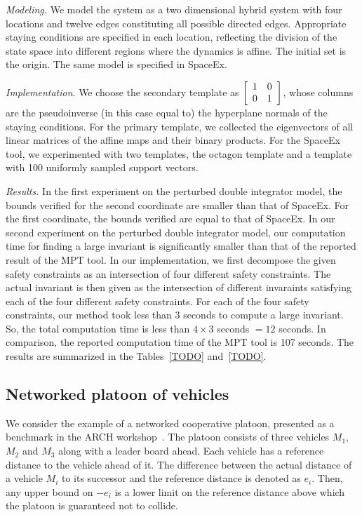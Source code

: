 \emph{Modeling.}  We model the system as a two dimensional hybrid
system with four locations and twelve edges constituting all possible
directed edges.  Appropriate staying conditions are specified in each
location, reflecting the division of the state space into different
regions where the dynamics is affine.  The initial set is the origin.
The same model is specified in SpaceEx.

\emph{Implementation}.  We choose the secondary template as
$\left[\begin{array}{ll}1 & 0\\0 & 1\end{array}\right]$, whose columns are
the pseudoinverse (in this case equal to) the hyperplane normals of
the staying conditions.  For the primary template, we collected the
eigenvectors of all linear matrices of the affine maps and their
binary products. For the SpaceEx tool, we experimented with two
templates, the octagon template and a template with 100 uniformly
sampled support vectors.

\emph{Results.}  In the first experiment on the perturbed double
integrator model, the bounds verified for the second coordinate are
smaller than that of SpaceEx.  For the first coordinate, the bounds
verified are equal to that of SpaceEx.  In our second experiment on
the perturbed double integrator model, our computation time for
finding a large invariant is significantly smaller than that of the
reported result of the MPT tool.  In our implementation, we first
decompose the given safety constraints as an intersection of four
different safety constraints.  The actual invariant is then given as
the intersection of different invaraints satisfying each of the four
different safety constraints.  For each of the four safety
constraints, our method took less than $3$ seconds to compute a large
invariant.  So, the total computation time is less than $4\times 3$
seconds $=12$ seconds.  In comparison, the reported computation time
of the MPT tool is 107 seconds.  The results are summarized in the
Tables~\ref{TODO} and~\ref{TODO}.



\subsection{Networked platoon of vehicles}
We consider the example of a networked cooperative platoon, presented
as a benchmark in the ARCH workshop~\cite{TODO}.  The platoon consists
of three vehicles $M_1$, $M_2$ and $M_3$ along with a leader board
ahead.  Each vehicle has a reference distance to the vehicle ahead of
it.  The difference between the actual distance of a vehicle $M_i$ to
its successor and the reference distance is denoted as $e_i$.  Then, any
upper bound on $-e_i$ is a lower limit on the reference distance
above which the platoon is guaranteed not to collide.

